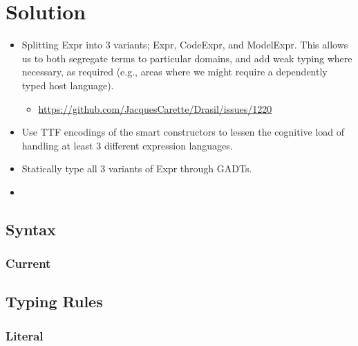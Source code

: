 \section{Solution}

\begin{itemize}
    
    \item Splitting Expr into 3 variants; Expr, CodeExpr, and ModelExpr.
          This allows us to both segregate terms to particular domains, and add
          weak typing where necessary, as required (e.g., areas where we might
          require a dependently typed host language).
          \begin{itemize}
            \item \url{https://github.com/JacquesCarette/Drasil/issues/1220}
          \end{itemize}
    
    \item Use TTF encodings of the smart constructors to lessen the cognitive
          load of handling at least 3 different expression languages.

    \item Statically type all 3 variants of Expr through GADTs.

    \item {}

\end{itemize}

\subsection{Syntax}

\subsubsection{Current}



\subsection{Typing Rules}

\subsubsection{Literal}



